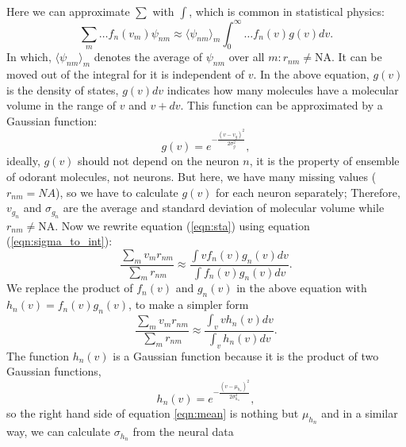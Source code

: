 \documentclass[a1paper,fontscale=0.6]{baposter} %
\begin{document}
\begin{poster}
{\begin{equation}
	\label{eqn:sta}
\end{equation}
Here we can approximate $\sum$ with $\int$, which is common in statistical physics:
\begin{equation}
	\sum_{m} \dots f_n(v_m) \psi_{nm} \approx  \langle \psi_{nm} \rangle_m \int_0^\infty \dots f_n(v) g(v)  dv. 
	\label{eqn:sigma_to_int}
\end{equation}
In which, 
$\langle \psi_{nm} \rangle_m$ denotes the average of $\psi_{nm}$ over all $m: r_{nm} \neq \text{NA}$. 
It can be moved out of the integral for it is independent of $v$.
In the above equation, 
$g(v)$ is the density of states, $g(v) dv$ indicates how many molecules have a molecular volume in the range of $v$ and $v+dv$.
This function can be approximated by a Gaussian function:  
\begin{equation}
	g(v) = e^{-\frac{(v- v_{g})^2}{2 \sigma_{g}^2}},
	\label{eqn:hist-volumes}
\end{equation}
ideally, $g(v)$ should not depend on the neuron $n$, 
it is the property of ensemble of odorant molecules, not neurons. 
But here, we have many missing values ($r_{nm} = NA$), 
so we have to calculate $g(v)$ for each neuron separately; 
Therefore, $v_{g_n}$ and $\sigma_{g_n}$ are the average and standard deviation of molecular volume while $r_{nm} \neq \text{NA}$.
Now we rewrite equation (\ref{eqn:sta}) using equation (\ref{eqn:sigma_to_int}):
\begin{equation}
	\frac{\displaystyle \sum_{m} v_m r_{nm}}{\displaystyle \sum_{m} r_{nm}} \approx \frac{\displaystyle \int v f_n(v) g_n(v) dv}{\displaystyle \int f_n(v) g_n(v) dv}.
	\label{eqn:sta_int}
\end{equation}
We replace the product of $f_n(v)$ and $g_n(v)$ in the above equation with $h_n(v) = f_n(v) g_n(v)$, to make a simpler form
\begin{equation}
	\frac{\displaystyle \sum_{m} v_m r_{nm}}{\displaystyle \sum_{m} r_{nm}} \approx \frac{\displaystyle \int_v v h_n(v) dv}{ \displaystyle \int_v  h_n(v) dv }.
	\label{eqn:mean}
\end{equation}
The function $h_n(v)$ is a Gaussian function because it is the product of two Gaussian functions, 
\begin{equation}
h_n(v) = e^{-\frac{(v-\mu_{h_n})^2}{2\sigma_{h_n}^2}}, 
\end{equation}
so the right hand side of equation \ref{eqn:mean} is nothing but $\mu_{h_n}$ and 
in a similar way, we can calculate $\sigma_{h_n}$ from the neural data
\begin{equation}

\end{equation}}
\end{poster}
\end{document}
